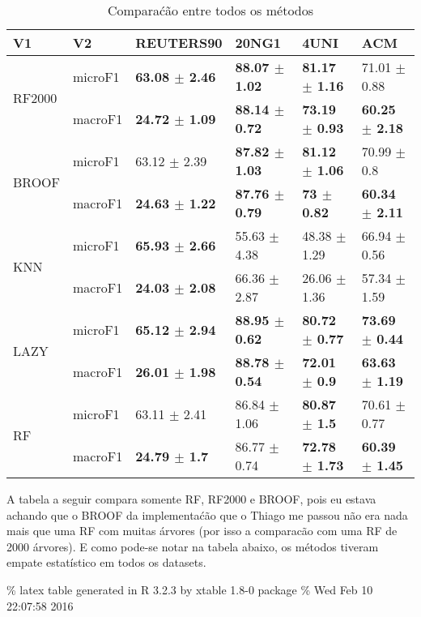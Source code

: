 \documentclass[]{article}
\begin{document}
\begin{table}[ht]
\centering
\begin{tabular}{llllll}
  \hline
V1 & V2 & REUTERS90 & 20NG1 & 4UNI & ACM \\ 
  \hline
\multirow{2}{*}{RF2000} & microF1 & \bf{63.08 $\pm$  2.46} & \bf{88.07 $\pm$  1.02} & \bf{81.17 $\pm$  1.16} & 71.01 $\pm$  0.88 \\ 
   & macroF1 & \bf{24.72 $\pm$  1.09} & \bf{88.14 $\pm$  0.72} & \bf{73.19 $\pm$  0.93} & \bf{60.25 $\pm$  2.18} \\ 
  \multirow{2}{*}{BROOF} & microF1 & 63.12 $\pm$  2.39 & \bf{87.82 $\pm$  1.03} & \bf{81.12 $\pm$  1.06} & 70.99 $\pm$  0.8 \\ 
   & macroF1 & \bf{24.63 $\pm$  1.22} & \bf{87.76 $\pm$  0.79} & \bf{73 $\pm$  0.82} & \bf{60.34 $\pm$  2.11} \\ 
  \multirow{2}{*}{KNN} & microF1 & \bf{65.93 $\pm$  2.66} & 55.63 $\pm$  4.38 & 48.38 $\pm$  1.29 & 66.94 $\pm$  0.56 \\ 
   & macroF1 & \bf{24.03 $\pm$  2.08} & 66.36 $\pm$  2.87 & 26.06 $\pm$  1.36 & 57.34 $\pm$  1.59 \\ 
  \multirow{2}{*}{LAZY} & microF1 & \bf{65.12 $\pm$  2.94} & \bf{88.95 $\pm$  0.62} & \bf{80.72 $\pm$  0.77} & \bf{73.69 $\pm$  0.44} \\ 
   & macroF1 & \bf{26.01 $\pm$  1.98} & \bf{88.78 $\pm$  0.54} & \bf{72.01 $\pm$  0.9} & \bf{63.63 $\pm$  1.19} \\ 
  \multirow{2}{*}{RF} & microF1 & 63.11 $\pm$  2.41 & 86.84 $\pm$  1.06 & \bf{80.87 $\pm$  1.5} & 70.61 $\pm$  0.77 \\ 
   & macroF1 & \bf{24.79 $\pm$  1.7} & 86.77 $\pm$  0.74 & \bf{72.78 $\pm$  1.73} & \bf{60.39 $\pm$  1.45} \\ 
   \hline
\end{tabular}
\caption{Comparaćão entre todos os métodos} 
\end{table}

A tabela a seguir compara somente RF, RF2000 e BROOF, pois eu estava
achando que o BROOF da implementaćão que o Thiago me passou não era nada
mais que uma RF com muitas árvores (por isso a comparacão com uma RF de
2000 árvores). E como pode-se notar na tabela abaixo, os métodos tiveram
empate estatístico em todos os datasets.

\% latex table generated in R 3.2.3 by xtable 1.8-0 package \% Wed Feb
10 22:07:58 2016
\end{document}
